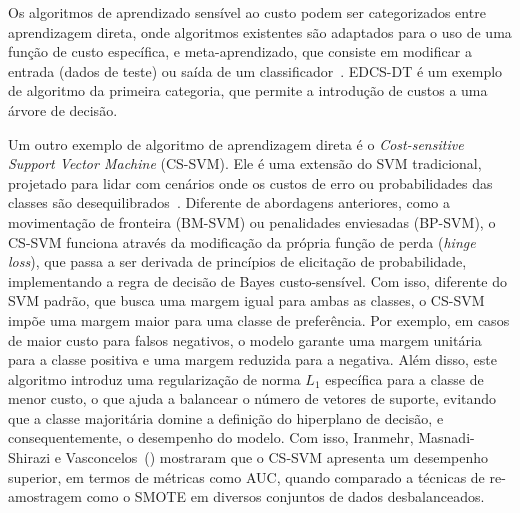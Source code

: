 Os algoritmos de aprendizado sensível ao custo podem ser categorizados entre aprendizagem direta, onde algoritmos existentes são adaptados para o uso de uma função de custo específica, e meta-aprendizado, que consiste em modificar a entrada (dados de teste) ou saída de um classificador~\cite{FernndezCs2018}. EDCS-DT é um exemplo de algoritmo da primeira categoria, que permite a introdução de custos a uma árvore de decisão.

Um outro exemplo de algoritmo de aprendizagem direta é o \textit{Cost-sensitive Support Vector Machine} (CS-SVM). Ele é uma extensão do SVM tradicional, projetado para lidar com cenários onde os custos de erro ou probabilidades das classes são desequilibrados~\cite{Iranmehr2019}. Diferente de abordagens anteriores, como a movimentação de fronteira (BM-SVM) ou penalidades enviesadas (BP-SVM), o CS-SVM funciona através da modificação da própria função de perda (\textit{hinge loss}), que passa a ser derivada de princípios de elicitação de probabilidade, implementando a regra de decisão de Bayes custo-sensível. Com isso, diferente do SVM padrão, que busca uma margem igual para ambas as classes, o CS-SVM impõe uma margem maior para uma classe de preferência. Por exemplo, em casos de maior custo para falsos negativos, o modelo garante uma margem unitária para a classe positiva e uma margem reduzida para a negativa. Além disso, este algoritmo introduz uma regularização de norma \(L_1\) específica para a classe de menor custo, o que ajuda a balancear o número de vetores de suporte, evitando que a classe majoritária domine a definição do hiperplano de decisão, e consequentemente, o desempenho do modelo. Com isso, Iranmehr, Masnadi-Shirazi e Vasconcelos~(\citeyear{Iranmehr2019}) mostraram que o CS-SVM apresenta um desempenho superior, em termos de métricas como AUC, quando comparado a técnicas de re-amostragem como o SMOTE em diversos conjuntos de dados desbalanceados.


